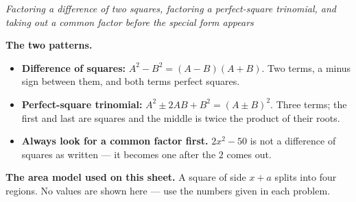 \documentclass[12pt]{article}
\begin{document}

\begin{center}
\textit{Factoring a difference of two squares, factoring a perfect-square
trinomial, and taking out a common factor before the special form appears}
\end{center}

\noindent\textbf{The two patterns.}
\begin{itemize}[leftmargin=1.2cm, itemsep=2pt, topsep=2pt]
\item \textbf{Difference of squares:} $A^2 - B^2 = (A - B)(A + B)$. Two terms,
a minus sign between them, and both terms perfect squares.
\item \textbf{Perfect-square trinomial:} $A^2 \pm 2AB + B^2 = (A \pm B)^2$.
Three terms; the first and last are squares and the middle is twice the product
of their roots.
\item \textbf{Always look for a common factor first.} $2x^2 - 50$ is not a
difference of squares as written --- it becomes one after the $2$ comes out.
\end{itemize}

\vspace{0.1cm}
\noindent\textbf{The area model used on this sheet.} A square of side $x + a$
splits into four regions. No values are shown here --- use the numbers given in
each problem.

\begin{center}
\end{center}




\end{document}

